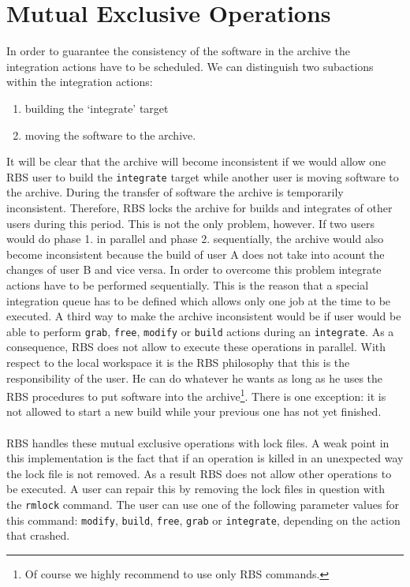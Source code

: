 \section{Mutual Exclusive Operations}
In order to guarantee the consistency of the software in the archive the
integration actions have to be scheduled. We can distinguish two subactions
within the integration actions:
\begin{enumerate}
\item building the `integrate' target
\item moving the software to the archive.
\end{enumerate}
It will be clear that the archive will become inconsistent if we would
allow one RBS user to build the \verb+integrate+ target while another user is
moving software to the archive. During the transfer of software the archive
is temporarily inconsistent. Therefore, RBS locks the archive
for builds and integrates of other users during this period. This is not the only problem, however. If two users would do phase 1. in parallel and phase 2.
sequentially, the archive would also become inconsistent because the build
of user A does not take into acount the changes of user B and vice versa.
In order to overcome this problem integrate actions have to be performed
sequentially. This is the reason that a special integration queue has to be
defined which allows only one job at the time to be executed.
A third way to make the archive inconsistent would be if user would be able to perform
\verb+grab+, \verb+free+, \verb+modify+ or \verb+build+ actions during an
\verb+integrate+. As a consequence, RBS does not allow to execute these operations in parallel.
With respect to the local workspace it is the RBS philosophy that this is
the responsibility of the user. He can do whatever he wants as long as he
uses the RBS procedures to put software into the archive\footnote{Of course we
highly recommend to use only RBS commands.}.  There is one exception: it is not allowed
to start a new build while your previous one has not yet finished.\\
\\
RBS handles these mutual exclusive operations with lock files. A weak point
in this implementation is the fact that if an operation is killed in an
unexpected way the lock file is not removed. As a result RBS does not allow
other operations to be executed. A user can repair this by removing the
lock files in question with the \verb+rmlock+ command. The user can use one of
the following parameter values for this command: \verb+modify+, \verb+build+,
 \verb+free+, \verb+grab+ or \verb+integrate+, depending on the action that crashed. 

